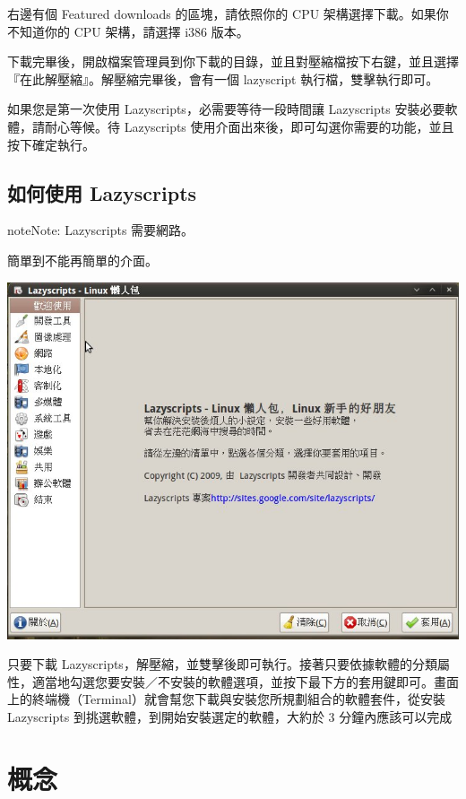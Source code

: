 \documentclass[letterpaper,10pt,english]{manual}
\begin{document}
右邊有個 Featured downloads 的區塊，請依照你的 CPU 架構選擇下載。如果你不知道你的 CPU 架構，請選擇 i386 版本。

下載完畢後，開啟檔案管理員到你下載的目錄，並且對壓縮檔按下右鍵，並且選擇『在此解壓縮』。解壓縮完畢後，會有一個 lazyscript 執行檔，雙擊執行即可。

如果您是第一次使用 Lazyscripts，必需要等待一段時間讓 Lazyscripts 安裝必要軟體，請耐心等候。待 Lazyscripts 使用介面出來後，即可勾選你需要的功能，並且按下確定執行。


\section{如何使用 Lazyscripts}

\begin{notice}{note}{Note:}
Lazyscripts 需要網路。
\end{notice}

簡單到不能再簡單的介面。

\includegraphics{userinterface.jpg}

只要下載 Lazyscripts，解壓縮，並雙擊後即可執行。接著只要依據軟體的分類屬性，適當地勾選您要安裝／不安裝的軟體選項，並按下最下方的套用鍵即可。畫面上的終端機（Terminal）就會幫您下載與安裝您所規劃組合的軟體套件，從安裝 Lazyscripts 到挑選軟體，到開始安裝選定的軟體，大約於 3 分鐘內應該可以完成

\resetcurrentobjects


\chapter{概念}
\end{document}
